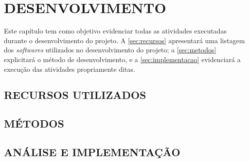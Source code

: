 
\chapter{DESENVOLVIMENTO}
\label{chap:desenvolvimento}
Este capítulo tem como objetivo evidenciar todas as atividades executadas durante o desenvolvimento do projeto. A \autoref{sec:recursos} apresentará uma listagem dos \textit{softwares} utilizados no desenvolvimento do projeto; a \autoref{sec:metodos} explicitará o método de desenvolvimento, e a \autoref{sec:implementacao} evidenciará a execução das atividades propriamente ditas.

\section{RECURSOS UTILIZADOS}
\label{sec:recursos}

\section{MÉTODOS}
\label{sec:metodos}

\section{ANÁLISE E IMPLEMENTAÇÃO}
\label{sec:implementacao}








